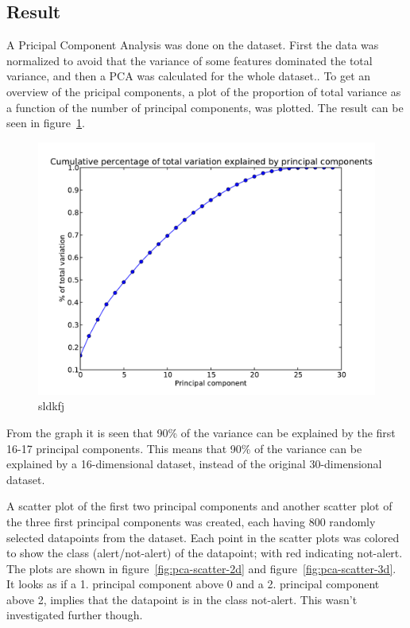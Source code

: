 \subsection{Result}
A Pricipal Component Analysis was done on the dataset. First the data was normalized to avoid that the variance of some features dominated the total variance, and then a PCA was calculated for the whole dataset.. To get an overview of the pricipal components, a plot of the proportion of total variance as a function of the number of principal components, was plotted. The result can be seen in figure~\ref{fig:variance-explained}.\par
\begin{figure}
    \centering
    \includegraphics[width=.75\textwidth]{../sessions/15-new-principal-components-analysis/plots/pca-variation-explained.pdf}
    \caption{sldkfj}\label{fig:variance-explained}
\end{figure}
From the graph it is seen that 90\% of the variance can be explained by the first 16-17 principal components. This means that 90\% of the variance can be explained by a 16-dimensional dataset, instead of the original 30-dimensional dataset.\par
A scatter plot of the first two principal components and another scatter plot of the three first principal components was created, each having 800 randomly selected datapoints from the dataset. Each point in the scatter plots was colored to show the class (alert/not-alert) of the datapoint; with red indicating not-alert. The plots are shown in figure~\ref{fig:pca-scatter-2d} and figure~\ref{fig:pca-scatter-3d}. It looks as if a 1. principal component above 0 and a 2. principal component above 2, implies that the datapoint is in the class not-alert. This wasn't investigated further though.
